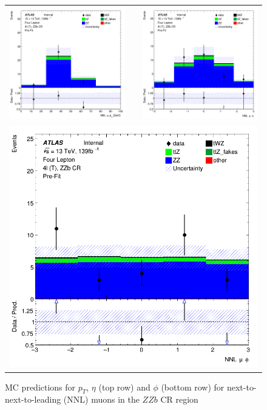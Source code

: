 \begin{figure}[htbp]
\centering
  \begin{tabular}{ccc}



    \includegraphics[width=.2\textwidth]{figures/PreFitPlots/lep4_ZZb_4T_NNL_mu_pt} & &
    \includegraphics[width=.2\textwidth]{figures/PreFitPlots/lep4_ZZb_4T_NNL_mu_eta}  \\
    \multicolumn{3}{c}{\includegraphics[width=.2\textwidth]{figures/PreFitPlots/lep4_ZZb_4T_NNL_mu_phi}}  \\
  \end{tabular}
    \caption{MC predictions for $p_{T}$, $\eta$ (top row) and $\phi$ (bottom row) for next-to-next-to-leading (NNL) muons in the $ZZb$ CR region }
  \label{fig:4lep-ZZb-CR-muonPlots}
\end{figure}
\clearpage
